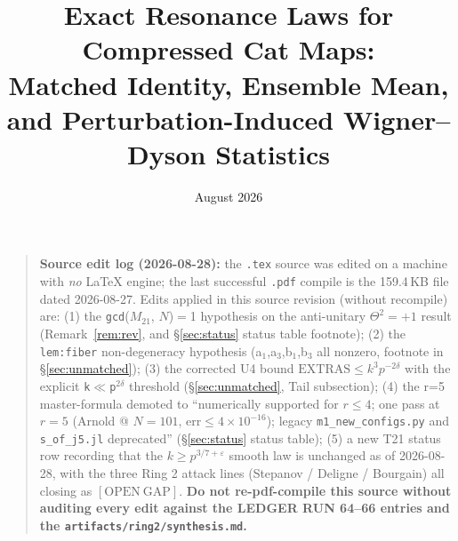 \documentclass[11pt]{article}
\title{Exact Resonance Laws for Compressed Cat Maps:\\
Matched Identity, Ensemble Mean,\\
and Perturbation-Induced Wigner--Dyson Statistics}
\author{}
\date{August 2026}
\begin{document}
\maketitle

\begin{quote}\small
\textbf{Source edit log (2026-08-28):} the \texttt{.tex} source
was edited on a machine with \emph{no} \LaTeX{} engine; the last
successful \texttt{.pdf} compile is the 159.4\,KB file dated
2026-08-27.  Edits applied in this source revision (without
recompile) are:
(1) the \texttt{gcd}($M_{21}$, $N$)$=$1 hypothesis on the
anti-unitary $\Theta^2=+1$ result (Remark~\ref{rem:rev},
and \S\ref{sec:status} status table footnote);
(2) the \texttt{lem:fiber} non-degeneracy hypothesis
(a$_1$,a$_3$,b$_1$,b$_3$ all nonzero, footnote in
\S\ref{sec:unmatched});
(3) the corrected U4 bound $\mathrm{EXTRAS}\le k^3p^{-2\delta}$
with the explicit \texttt{k}$\ll$\texttt{p$^{2\delta}$} threshold
(\S\ref{sec:unmatched}, Tail subsection);
(4) the r=5 master-formula demoted to ``numerically supported for
$r\le4$; one pass at $r=5$ (Arnold @ $N=101$, err$\le 4\times
10^{-16}$); legacy \texttt{m1\_new\_configs.py} and
\texttt{s\_of\_j5.jl} deprecated'' (\S\ref{sec:status} status
table);
(5) a new T21 status row recording that the $k\ge p^{3/7+\varepsilon}$
smooth law is unchanged as of 2026-08-28, with the three
Ring 2 attack lines (Stepanov / Deligne / Bourgain) all closing
as $[\mathrm{OPEN\ GAP}]$.
\textbf{Do not re-pdf-compile this source without auditing every
edit against the LEDGER RUN 64--66 entries and the
\texttt{artifacts/ring2/synthesis.md}.}
\end{quote}
\end{document}
